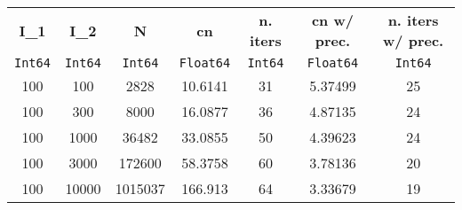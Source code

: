 \begin{tabular}{ccccccc}
  \hline\hline
  \textbf{I\_1} & \textbf{I\_2} & \textbf{N} & \textbf{cn} & \textbf{n. iters} & \textbf{cn w/ prec.} & \textbf{n. iters w/ prec.} \\
  \texttt{Int64} & \texttt{Int64} & \texttt{Int64} & \texttt{Float64} & \texttt{Int64} & \texttt{Float64} & \texttt{Int64} \\\hline
  100 & 100 & 2828 & 10.6141 & 31 & 5.37499 & 25 \\
  100 & 300 & 8000 & 16.0877 & 36 & 4.87135 & 24 \\
  100 & 1000 & 36482 & 33.0855 & 50 & 4.39623 & 24 \\
  100 & 3000 & 172600 & 58.3758 & 60 & 3.78136 & 20 \\
  100 & 10000 & 1015037 & 166.913 & 64 & 3.33679 & 19 \\\hline\hline
\end{tabular}
